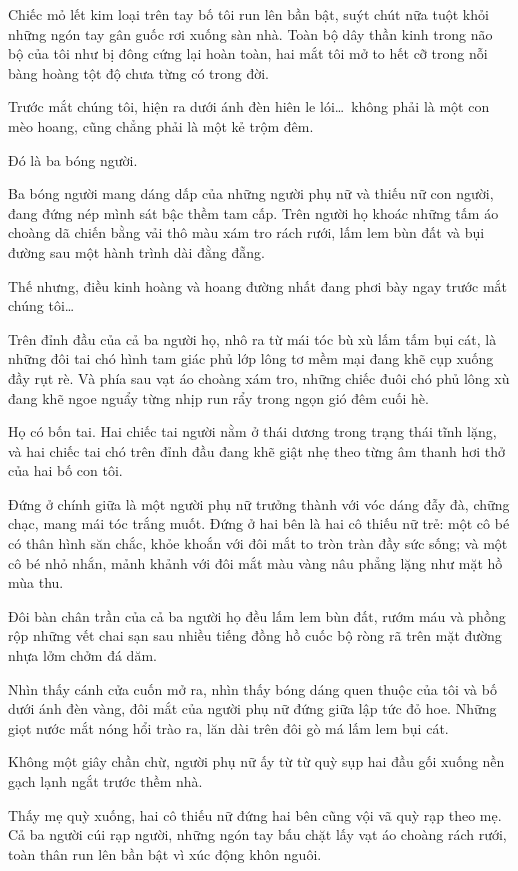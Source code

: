 \documentclass[../main.tex]{subfiles}
\begin{document}
Chiếc mỏ lết kim loại trên tay bố tôi run lên bần bật, suýt chút nữa tuột khỏi những ngón tay gân guốc rơi xuống sàn nhà. Toàn bộ dây thần kinh trong não bộ của tôi như bị đông cứng lại hoàn toàn, hai mắt tôi mở to hết cỡ trong nỗi bàng hoàng tột độ chưa từng có trong đời.

Trước mắt chúng tôi, hiện ra dưới ánh đèn hiên le lói\dots\ không phải là một con mèo hoang, cũng chẳng phải là một kẻ trộm đêm.

Đó là ba bóng người.

Ba bóng người mang dáng dấp của những người phụ nữ và thiếu nữ con người, đang đứng nép mình sát bậc thềm tam cấp. Trên người họ khoác những tấm áo choàng dã chiến bằng vải thô màu xám tro rách rưới, lấm lem bùn đất và bụi đường sau một hành trình dài đằng đẵng.

Thế nhưng, điều kinh hoàng và hoang đường nhất đang phơi bày ngay trước mắt chúng tôi\dots

Trên đỉnh đầu của cả ba người họ, nhô ra từ mái tóc bù xù lấm tấm bụi cát, là những đôi tai chó hình tam giác phủ lớp lông tơ mềm mại đang khẽ cụp xuống đầy rụt rè. Và phía sau vạt áo choàng xám tro, những chiếc đuôi chó phủ lông xù đang khẽ ngoe nguẩy từng nhịp run rẩy trong ngọn gió đêm cuối hè.

Họ có bốn tai. Hai chiếc tai người nằm ở thái dương trong trạng thái tĩnh lặng, và hai chiếc tai chó trên đỉnh đầu đang khẽ giật nhẹ theo từng âm thanh hơi thở của hai bố con tôi.

Đứng ở chính giữa là một người phụ nữ trưởng thành với vóc dáng đẫy đà, chững chạc, mang mái tóc trắng muốt. Đứng ở hai bên là hai cô thiếu nữ trẻ: một cô bé có thân hình săn chắc, khỏe khoắn với đôi mắt to tròn tràn đầy sức sống; và một cô bé nhỏ nhắn, mảnh khảnh với đôi mắt màu vàng nâu phẳng lặng như mặt hồ mùa thu.

Đôi bàn chân trần của cả ba người họ đều lấm lem bùn đất, rướm máu và phồng rộp những vết chai sạn sau nhiều tiếng đồng hồ cuốc bộ ròng rã trên mặt đường nhựa lởm chởm đá dăm.

Nhìn thấy cánh cửa cuốn mở ra, nhìn thấy bóng dáng quen thuộc của tôi và bố dưới ánh đèn vàng, đôi mắt của người phụ nữ đứng giữa lập tức đỏ hoe. Những giọt nước mắt nóng hổi trào ra, lăn dài trên đôi gò má lấm lem bụi cát.

Không một giây chần chừ, người phụ nữ ấy từ từ quỳ sụp hai đầu gối xuống nền gạch lạnh ngắt trước thềm nhà.

Thấy mẹ quỳ xuống, hai cô thiếu nữ đứng hai bên cũng vội vã quỳ rạp theo mẹ. Cả ba người cúi rạp người, những ngón tay bấu chặt lấy vạt áo choàng rách rưới, toàn thân run lên bần bật vì xúc động khôn nguôi.
\end{document}
